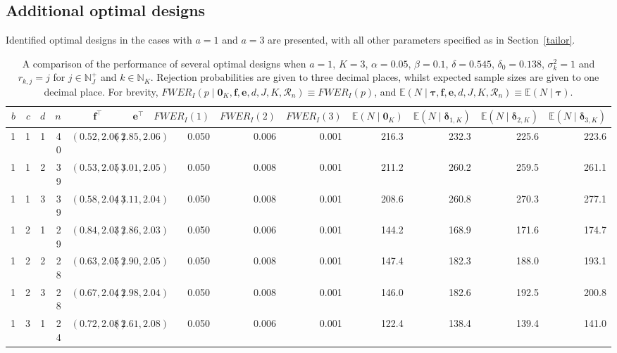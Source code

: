 \documentclass{article}
\numberwithin{equation}{section}
\theoremstyle{plain}
\begin{document}
\subsection{Additional optimal designs}

Identified optimal designs in the cases with $a=1$ and $a=3$ are presented, with all other parameters specified as in Section~\ref{tailor}.

\def\arraystretch{1.2}
\begin{sidewaystable}[htbp]
	\begin{center}
		\caption{A comparison of the performance of several optimal designs when $a=1$, $K=3$, $\alpha=0.05$, $\beta=0.1$, $\delta=0.545$, $\delta_0=0.138$, $\sigma_k^2=1$ and $r_{k,j}=j$ for $j\in\mathbb{N}_J^+$ and $k\in\mathbb{N}_K$. Rejection probabilities are given to three decimal places, whilst expected sample sizes are given to one decimal place. For brevity,  $FWER_I(p\mid\boldsymbol{0}_K, \boldsymbol{f},\boldsymbol{e},d,J,K,\mathscr{R}_n)\equiv FWER_I(p)$, and $\mathbb{E}(N\mid\boldsymbol{\tau},\boldsymbol{f},\boldsymbol{e},d,J,K,\mathscr{R}_n)\equiv \mathbb{E}(N\mid\boldsymbol{\tau})$.}
		\label{taba3}
		\begin{tabular}{rrrrrrrrrrrrr}
			\hline
			$b$ & $c$ & $d$ & $n$ & $\boldsymbol{f}^\top$ & $\boldsymbol{e}^\top$ & $FWER_I(1)$ & $FWER_I(2)$ & $FWER_I(3)$ & $\mathbb{E}(N\mid\boldsymbol{0}_K)$ & $\mathbb{E}(N\mid\boldsymbol{\delta}_{1,K})$ & $\mathbb{E}(N\mid\boldsymbol{\delta}_{2,K})$ & $\mathbb{E}(N\mid\boldsymbol{\delta}_{3,K})$ \\
			\hline
			1 & 1 & 1 & 40 & $(0.52, 2.06)$ & $(2.85, 2.06)$ & 0.050 & 0.006 & 0.001 & 216.3 & 232.3 & 225.6 & 223.6 \\
			1 & 1 & 2 & 39 & $(0.53, 2.05)$ & $(3.01, 2.05)$ & 0.050 & 0.008 & 0.001 & 211.2 & 260.2 & 259.5 & 261.1 \\
			1 & 1 & 3 & 39 & $(0.58, 2.04)$ & $(3.11, 2.04)$ & 0.050 & 0.008 & 0.001 & 208.6 & 260.8 & 270.3 & 277.1 \\
			1 & 2 & 1 & 29 & $(0.84, 2.03)$ & $(2.86, 2.03)$ & 0.050 & 0.006 & 0.001 & 144.2 & 168.9 & 171.6 & 174.7 \\
			1 & 2 & 2 & 28 & $(0.63, 2.05)$ & $(2.90, 2.05)$ & 0.050 & 0.008 & 0.001 & 147.4 & 182.3 & 188.0 & 193.1 \\
			1 & 2 & 3 & 28 & $(0.67, 2.04)$ & $(2.98, 2.04)$ & 0.050 & 0.008 & 0.001 & 146.0 & 182.6 & 192.5 & 200.8 \\
			1 & 3 & 1 & 24 & $(0.72, 2.08)$ & $(2.61, 2.08)$ & 0.050 & 0.006 & 0.001 & 122.4 & 138.4 & 139.4 & 141.0 \\

\end{tabular}
\end{center}
\end{sidewaystable}
\end{document}
